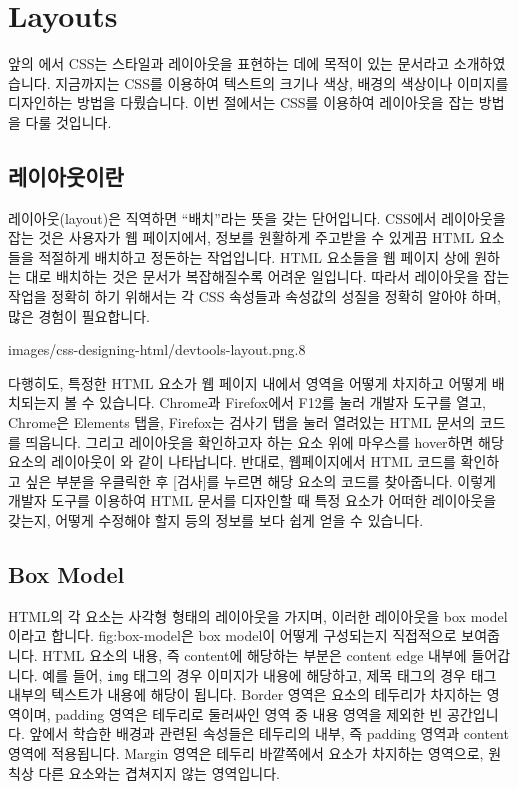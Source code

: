 \section{Layouts} \label{sect:layouts}

앞의 에서 CSS는 스타일과 레이아웃을 표현하는 데에 목적이 있는 문서라고 소개하였습니다. 지금까지는 CSS를 이용하여 텍스트의 크기나 색상, 배경의 색상이나 이미지를 디자인하는 방법을 다뤘습니다. 이번 절에서는 CSS를 이용하여 레이아웃을 잡는 방법을 다룰 것입니다. 

\subsection*{레이아웃이란}
레이아웃(layout)은 직역하면 ``배치''라는 뜻을 갖는 단어입니다. CSS에서 레이아웃을 잡는 것은 사용자가 웹 페이지에서, 정보를 원활하게 주고받을 수 있게끔 HTML 요소들을 적절하게 배치하고 정돈하는 작업입니다. HTML 요소들을 웹 페이지 상에 원하는 대로 배치하는 것은 문서가 복잡해질수록 어려운 일입니다. 따라서 레이아웃을 잡는 작업을 정확히 하기 위해서는 각 CSS 속성들과 속성값의 성질을 정확히 알아야 하며, 많은 경험이 필요합니다. 

    {images/css-designing-html/devtools-layout.png}{.8}

다행히도, 특정한 HTML 요소가 웹 페이지 내에서 영역을 어떻게 차지하고 어떻게 배치되는지 볼 수 있습니다. Chrome과 Firefox에서 F12를 눌러 개발자 도구를 열고, Chrome은 Elements 탭을, Firefox는 검사기 탭을 눌러 열려있는 HTML 문서의 코드를 띄웁니다. 그리고 레이아웃을 확인하고자 하는 요소 위에 마우스를 hover하면 해당 요소의 레이아웃이 와 같이 나타납니다. 반대로, 웹페이지에서 HTML 코드를 확인하고 싶은 부분을 우클릭한 후 [검사]를 누르면 해당 요소의 코드를 찾아줍니다. 이렇게 개발자 도구를 이용하여 HTML 문서를 디자인할 때 특정 요소가 어떠한 레이아웃을 갖는지, 어떻게 수정해야 할지 등의 정보를 보다 쉽게 얻을 수 있습니다. 

\subsection*{Box Model}
HTML의 각 요소는 사각형 형태의 레이아웃을 가지며, 이러한 레이아웃을 box model이라고 합니다. {fig:box-model}은 box model이 어떻게 구성되는지 직접적으로 보여줍니다. HTML 요소의 내용, 즉 content에 해당하는 부분은 content edge 내부에 들어갑니다. 예를 들어, \texttt{img} 태그의 경우 이미지가 내용에 해당하고, 제목 태그의 경우 태그 내부의 텍스트가 내용에 해당이 됩니다. Border 영역은 요소의 테두리가 차지하는 영역이며, padding 영역은 테두리로 둘러싸인 영역 중 내용 영역을 제외한 빈 공간입니다. 앞에서 학습한 배경과 관련된 속성들은 테두리의 내부, 즉 padding 영역과 content 영역에 적용됩니다. Margin 영역은 테두리 바깥쪽에서 요소가 차지하는 영역으로, 원칙상 다른 요소와는 겹쳐지지 않는 영역입니다.

